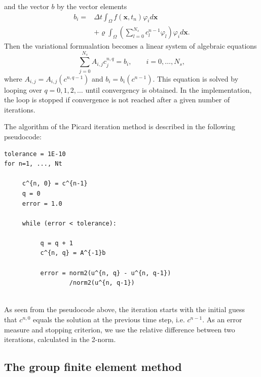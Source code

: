 \documentclass[twoside]{article}
\begin{document}
and the vector $b$ by the vector elements
\begin{align}
  b_{i} =& \Delta t \int_{\Omega }f(\mathbf{x}, t_{n})\varphi_{i}d\mathbf{x} \nonumber \\
  & + \varrho \int_{\Omega }\left( \sum_{l=0}^{N_{s}}c_{l}^{n-1}\varphi_{l}\right) \varphi_{i}d\mathbf{x}.
\end{align}
Then the variational formualation becomes a linear system of algebraic equations
\begin{equation}
  \sum_{j=0}^{N_{s}}A_{i, j}c_{j}^{n, q} = b_{i}, \qquad i = 0, \dots , N_{s},
\end{equation}
where $A_{i, j} = A_{i, j}(c^{n, q-1})$ and $b_{i} = b_{i}(c^{n-1})$. This equation is solved by looping over $q = 0, 1, 2, \dots $ until convergency is obtained. In the implementation, the loop is stopped if convergence is not reached after a given number of iterations. 

The algorithm of the Picard iteration method is described in the following pseudocode:
\begin{verbatim}
tolerance = 1E-10
for n=1, ..., Nt
     
     c^{n, 0} = c^{n-1}
     q = 0
     error = 1.0

     while (error < tolerance):
     
          q = q + 1
          c^{n, q} = A^{-1}b

          error = norm2(u^{n, q} - u^{n, q-1})
                  /norm2(u^{n, q-1})
 

\end{verbatim}
As seen from the pseudocode above, the iteration starts with the initial guess that $c^{n, 0}$ equals the solution at the previous time step, i.e. $c^{n-1}$. As an error measure and stopping criterion, we use the relative difference between two iterations, calculated in the 2-norm.

\subsection{The group finite element method}
\end{document}
